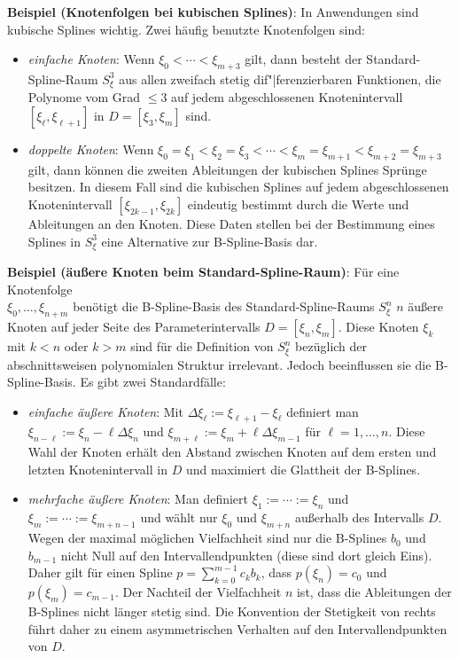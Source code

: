 \linie
\pagebreak

\textbf{Beispiel (Knotenfolgen bei kubischen Splines)}:
In Anwendungen sind kubische Splines wichtig.
Zwei häufig benutzte Knotenfolgen sind:
\begin{itemize}
    \item
    \emph{einfache Knoten}:
    Wenn $\xi_0 < \dotsb < \xi_{m+3}$ gilt,
    dann besteht der Standard-Spline-Raum $S_\xi^3$ aus allen zweifach stetig dif"|ferenzierbaren
    Funktionen, die Polynome vom Grad $\le 3$ auf jedem abgeschlossenen Knotenintervall
    $[\xi_\ell, \xi_{\ell+1}]$ in $D = [\xi_3, \xi_m]$ sind.
    
    \item
    \emph{doppelte Knoten}:
    Wenn $\xi_0 = \xi_1 < \xi_2 = \xi_3 < \dotsb < \xi_m = \xi_{m+1} < \xi_{m+2} = \xi_{m+3}$ gilt,
    dann können die zweiten Ableitungen der kubischen Splines Sprünge besitzen.
    In diesem Fall sind die kubischen Splines auf jedem abgeschlossenen Knotenintervall
    $[\xi_{2k-1}, \xi_{2k}]$ eindeutig bestimmt durch die Werte und Ableitungen an den Knoten.
    Diese Daten stellen bei der Bestimmung eines Splines in $S_\xi^3$
    eine Alternative zur B-Spline-Basis dar.
\end{itemize}

\linie

\textbf{Beispiel (äußere Knoten beim Standard-Spline-Raum)}:
Für eine Knotenfolge\\
$\xi_0, \dotsc, \xi_{n+m}$ benötigt die B-Spline-Basis des
Standard-Spline-Raums $S_\xi^n$ $n$ äußere Knoten auf jeder Seite des Parameterintervalls
$D = [\xi_n, \xi_m]$.
Diese Knoten $\xi_k$ mit $k < n$ oder $k > m$ sind für die Definition von $S_\xi^n$ bezüglich
der abschnittsweisen polynomialen Struktur irrelevant.
Jedoch beeinflussen sie die B-Spline-Basis.
Es gibt zwei Standardfälle:
\begin{itemize}
    \item
    \emph{einfache äußere Knoten}:
    Mit $\Delta\xi_\ell := \xi_{\ell+1} - \xi_\ell$ definiert man
    $\xi_{n-\ell} := \xi_n - \ell \Delta\xi_n$ und $\xi_{m+\ell} := \xi_m + \ell \Delta\xi_{m-1}$
    für $\ell = 1, \dotsc, n$.
    Diese Wahl der Knoten erhält den Abstand zwischen Knoten auf dem ersten und letzten
    Knotenintervall in $D$ und maximiert die Glattheit der B-Splines.
    
    \item
    \emph{mehrfache äußere Knoten}:
    Man definiert  $\xi_1 := \dotsb := \xi_n$ und $\xi_m := \dotsb := \xi_{m+n-1}$
    und wählt nur $\xi_0$ und $\xi_{m+n}$ außerhalb des Intervalls $D$.
    Wegen der maximal möglichen Vielfachheit sind nur die B-Splines $b_0$ und $b_{m-1}$
    nicht Null auf den Intervallendpunkten (diese sind dort gleich Eins).
    Daher gilt für einen Spline $p = \sum_{k=0}^{m-1} c_k b_k$, dass
    $p(\xi_n) = c_0$ und $p(\xi_m) = c_{m-1}$.
    Der Nachteil der Vielfachheit $n$ ist, dass die Ableitungen der B-Splines nicht länger
    stetig sind.
    Die Konvention der Stetigkeit von rechts führt daher zu einem asymmetrischen Verhalten
    auf den Intervallendpunkten von $D$.
\end{itemize}

